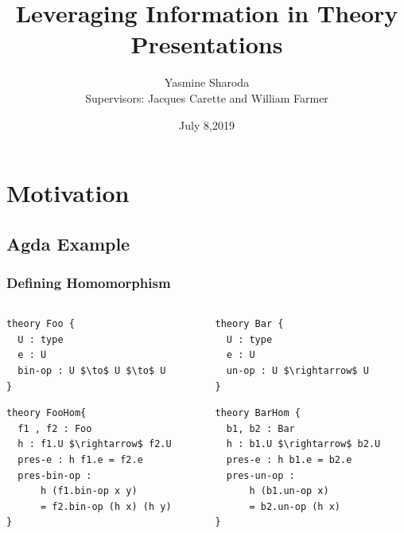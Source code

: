 \documentclass[t,12pt,numbers,fleqn,usenames,xcolor=dvipsnames]{beamer}
\title{Leveraging Information in Theory Presentations}
\author{Yasmine Sharoda\\ \vspace{0.5cm} Supervisors: Jacques Carette and William Farmer}
\institute[]{Department of Computing and Software, McMaster University}
\date{July 8,2019}
\begin{document}
\begin{frame}
\titlepage
\end{frame}

\section{Motivation}

\subsection{Agda Example}
\begin{frame}[fragile]
\frametitle{Defining Homomorphism}
\begin{columns}
	\begin{column}{0.45\textwidth}
\scriptsize		
		\begin{lstlisting}[mathescape]
theory Foo { 
  U : type 
  e : U 
  bin-op : U $\to$ U $\to$ U
}
		\end{lstlisting}
\pause		
		\begin{lstlisting}
theory FooHom{
  f1 , f2 : Foo 
  h : f1.U $\rightarrow$ f2.U 
  pres-e : h f1.e = f2.e  
  pres-bin-op : 
      h (f1.bin-op x y) 
      = f2.bin-op (h x) (h y)
}
		\end{lstlisting}
	\end{column}
	\begin{column}{0.45\textwidth}
\pause		
\scriptsize
	 	\begin{lstlisting}
theory Bar {
  U : type 
  e : U 
  un-op : U $\rightarrow$ U 
}
	 	\end{lstlisting}
\pause
		\begin{lstlisting}
theory BarHom { 
  b1, b2 : Bar 
  h : b1.U $\rightarrow$ b2.U 
  pres-e : h b1.e = b2.e  
  pres-un-op : 
      h (b1.un-op x) 
      = b2.un-op (h x)
}
		\end{lstlisting}
	\end{column}
\end{columns}
\end{frame}
\end{document}
